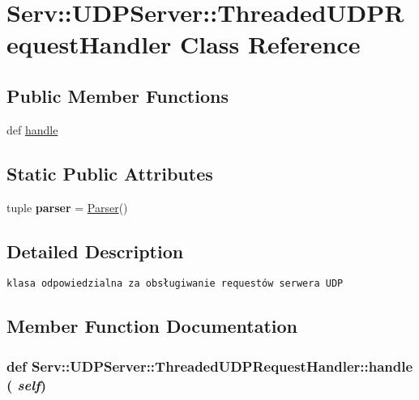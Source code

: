 \hypertarget{class_serv_1_1_u_d_p_server_1_1_threaded_u_d_p_request_handler}{
\section{Serv::UDPServer::ThreadedUDPRequestHandler Class Reference}
\label{class_serv_1_1_u_d_p_server_1_1_threaded_u_d_p_request_handler}
}
\subsection*{Public Member Functions}
\begin{CompactItemize}
\item 
def \hyperlink{class_serv_1_1_u_d_p_server_1_1_threaded_u_d_p_request_handler_94afb499da79b188e658f8b2d4bffb9a}{handle}
\end{CompactItemize}
\subsection*{Static Public Attributes}
\begin{CompactItemize}
\item 
\hypertarget{class_serv_1_1_u_d_p_server_1_1_threaded_u_d_p_request_handler_c0a5ee1efde591fb33de85283b9b4d3f}{
tuple \textbf{parser} = \hyperlink{class_serv_1_1_parser_1_1_parser}{Parser}()}
\label{class_serv_1_1_u_d_p_server_1_1_threaded_u_d_p_request_handler_c0a5ee1efde591fb33de85283b9b4d3f}

\end{CompactItemize}


\subsection{Detailed Description}


\footnotesize\begin{verbatim}klasa odpowiedzialna za obsługiwanie requestów serwera UDP

\end{verbatim}
\normalsize
 

\subsection{Member Function Documentation}
\hypertarget{class_serv_1_1_u_d_p_server_1_1_threaded_u_d_p_request_handler_94afb499da79b188e658f8b2d4bffb9a}{
\subsubsection[{handle}]{\setlength{\rightskip}{0pt plus 5cm}def Serv::UDPServer::ThreadedUDPRequestHandler::handle ( {\em self})}}
\label{class_serv_1_1_u_d_p_server_1_1_threaded_u_d_p_request_handler_94afb499da79b188e658f8b2d4bffb9a}




